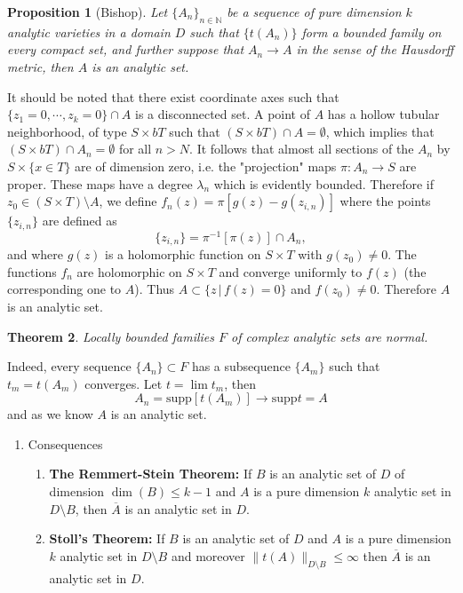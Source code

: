 \documentclass[12pt,twoside,a4paper]{report}
\newtheorem{theorem}{Theorem}[section]
\newtheorem{prop}[theorem]{Proposition}
\begin{document}
\begin{prop}[Bishop]
Let $\{A_n\}_{n\in\mathbb{N}}$ be a sequence of pure dimension $k$ analytic varieties in a domain $D$ such that $\{t(A_n)\}$ form a bounded family on every compact set, and further suppose that $A_n\rightarrow A$ in the sense of the Hausdorff metric, then $A$ is an analytic set.
\end{prop}

It should be noted that there exist coordinate axes such that $\{z_1=0,\cdots,z_k=0\}\cap A$ is a disconnected set. A point of $A$ has a hollow tubular neighborhood, of type $S\times bT$ such that $(S\times bT)\cap A=\emptyset$, which implies that $(S\times bT)\cap A_n=\emptyset$ for all $n>N$. It follows that almost all sections of the $A_n$ by $S\times\{x\in T\}$ are of dimension zero, i.e. the "projection" maps $\pi:A_n\rightarrow S$ are proper. These maps have a degree $\lambda_n$ which is evidently bounded. Therefore if $z_0\in(S\times T)\setminus A$, we define $f_n(z)=\pi[g(z)-g(z_{i,n})]$ where the points $\{z_{i,n}\}$ are defined as
\[
\{z_{i,n}\}=\pi^{-1}[\pi(z)]\cap A_n,
\]
and where $g(z)$ is a holomorphic function on $S\times T$ with $g(z_0)\neq0$. The functions $f_n$ are holomorphic on $S\times T$ and converge uniformly to $f(z)$ (the corresponding one to $A$). Thus $A\subset\{z\,|\,f(z)=0\}$ and $f(z_0)\neq0$. Therefore $A$ is an analytic set.

\begin{theorem}
Locally bounded families $F$ of complex analytic sets are normal.
\end{theorem}

Indeed, every sequence $\{A_n\}\subset F$ has a subsequence $\{A_m\}$ such that $t_m=t(A_m)$ converges. Let $t=\lim t_m$, then
\[
    A_n=\mathrm{supp}[t(A_m)]\rightarrow\mathrm{supp}t=A
\]
and as we know $A$ is an analytic set.

\begin{enumerate}
\item Consequences
\label{sec:org6dba31e}
\begin{enumerate}
\item \textbf{The Remmert-Stein Theorem:} If $B$ is an analytic set of $D$ of dimension $\dim(B)\leq k-1$ and $A$ is a pure dimension $k$ analytic set in $D\setminus B$, then $\overline{A}$ is an analytic set in $D$.
\item \textbf{Stoll's Theorem:} If $B$ is an analytic set of $D$ and $A$ is a pure dimension $k$ analytic set in $D\setminus B$ and moreover $\|t(A)\|_{D\setminus B}\leq\infty$ then $\overline{A}$ is an analytic set in $D$.
\end{enumerate}
\end{enumerate}
\end{document}
